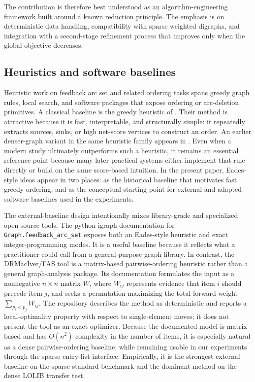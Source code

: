 The contribution is therefore best understood as an algorithm-engineering framework built around a known reduction principle. The emphasis is on deterministic data handling, compatibility with sparse weighted digraphs, and integration with a second-stage refinement process that improves only when the global objective decreases.

\subsection{Heuristics and software baselines}

Heuristic work on feedback arc set and related ordering tasks spans greedy graph rules, local search, and software packages that expose ordering or arc-deletion primitives. A classical baseline is the greedy heuristic of \cite{ELS93}. Their method is attractive because it is fast, interpretable, and structurally simple: it repeatedly extracts sources, sinks, or high net-score vertices to construct an order. An earlier denser-graph variant in the same heuristic family appears in \cite{EL95}. Even when a modern study ultimately outperforms such a heuristic, it remains an essential reference point because many later practical systems either implement that rule directly or build on the same score-based intuition. In the present paper, Eades-style ideas appear in two places: as the historical baseline that motivates fast greedy ordering, and as the conceptual starting point for external and adapted software baselines used in the experiments.

The external-baseline design intentionally mixes library-grade and specialized open-source tools. The python-igraph documentation for \texttt{Graph.feedback\_arc\_set} \cite{python_igraph_feedback_arc_set} exposes both an Eades-style heuristic and exact integer-programming modes. It is a useful baseline because it reflects what a practitioner could call from a general-purpose graph library. In contrast, the DRMacIver/FAS tool \cite{drmaciver_feedback_arc_set} is a matrix-based pairwise-ordering heuristic rather than a general graph-analysis package. Its documentation formulates the input as a nonnegative \(n \times n\) matrix \(W\), where \(W_{ij}\) represents evidence that item \(i\) should precede item \(j\), and seeks a permutation maximizing the total forward weight \(\sum_{p_i < p_j} W_{ij}\). The repository describes the method as deterministic and reports a local-optimality property with respect to single-element moves; it does not present the tool as an exact optimizer. Because the documented model is matrix-based and has \(O(n^2)\) complexity in the number of items, it is especially natural as a dense pairwise-ordering baseline, while remaining usable in our experiments through the sparse entry-list interface. Empirically, it is the strongest external baseline on the sparse standard benchmark and the dominant method on the dense LOLIB transfer test.

